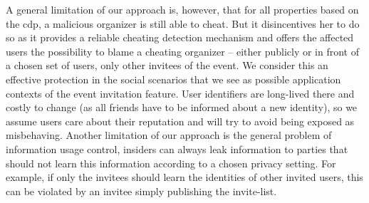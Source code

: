 A general limitation of our approach is, however, that for all
properties based on the \acl{cdp}, a malicious 
organizer is still able to cheat. But it disincentives her to do so as it
provides a reliable cheating detection mechanism and offers the affected
users the possibility to blame a cheating organizer -- either publicly
or in front of a chosen set of users, \eg only other invitees of the 
event. 
We consider this an effective protection in the social scenarios that we
see as possible application contexts of the event invitation feature.
User identifiers are long-lived there and costly to change (as all
friends have to be informed about a new identity), so we assume users 
care about their reputation and will try to avoid being exposed as
misbehaving.
%
%
%
%
Another limitation of our approach is the general problem of information
usage control, \ie insiders can always leak information to parties that
should not learn this information according to a chosen privacy setting.
For example, if only the invitees should learn the identities of other
invited users, this can be violated by an invitee simply publishing the
invite-list. 

